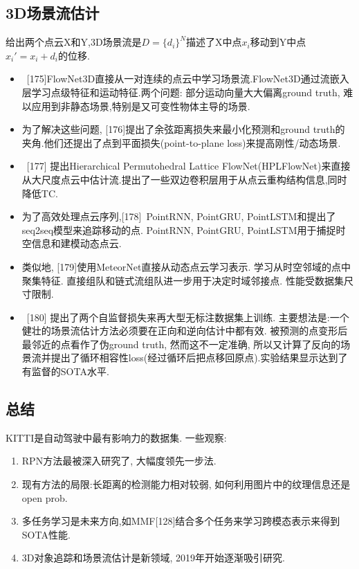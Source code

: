 \documentclass{article}
\begin{document}
\subsection{3D场景流估计}

给出两个点云X和Y,3D场景流是$D=\{d_i\}^N$描述了X中点$x_i$移动到Y中点$x_i'=x_i+d_i$的位移.

\begin{itemize}
    \item \ [175]FlowNet3D直接从一对连续的点云中学习场景流.FlowNet3D通过流嵌入层学习点级特征和运动特征.两个问题: 部分运动向量大大偏离ground truth, 难以应用到非静态场景,特别是又可变性物体主导的场景.
    \item 为了解决这些问题, [176]提出了余弦距离损失来最小化预测和ground truth的夹角.他们还提出了点到平面损失(point-to-plane loss)来提高刚性/动态场景.
    \item \ [177] 提出Hierarchical Permutohedral Lattice FlowNet(HPLFlowNet)来直接从大尺度点云中估计流.提出了一些双边卷积层用于从点云重构结构信息,同时降低TC.
    \item 为了高效处理点云序列,[178]~PointRNN, PointGRU, PointLSTM和提出了seq2seq模型来追踪移动的点. PointRNN, PointGRU, PointLSTM用于捕捉时空信息和建模动态点云.
    \item 类似地, [179]使用MeteorNet直接从动态点云学习表示. 学习从时空邻域的点中聚集特征. 直接组队和链式流组队进一步用于决定时域邻接点. 性能受数据集尺寸限制.
    \item \ [180] 提出了两个自监督损失来再大型无标注数据集上训练. 主要想法是:一个健壮的场景流估计方法必须要在正向和逆向估计中都有效. 被预测的点变形后最邻近的点看作了伪ground truth, 然而这不一定准确, 所以又计算了反向的场景流并提出了循环相容性loss(经过循环后把点移回原点).实验结果显示达到了有监督的SOTA水平.
\end{itemize}

\subsection{总结}

KITTI是自动驾驶中最有影响力的数据集. 一些观察:
\begin{enumerate}
    \item RPN方法最被深入研究了, 大幅度领先一步法.
    \item 现有方法的局限:长距离的检测能力相对较弱, 如何利用图片中的纹理信息还是open prob.
    \item 多任务学习是未来方向,如MMF[128]结合多个任务来学习跨模态表示来得到SOTA性能.
    \item 3D对象追踪和场景流估计是新领域, 2019年开始逐渐吸引研究.
\end{enumerate}
\end{document}
